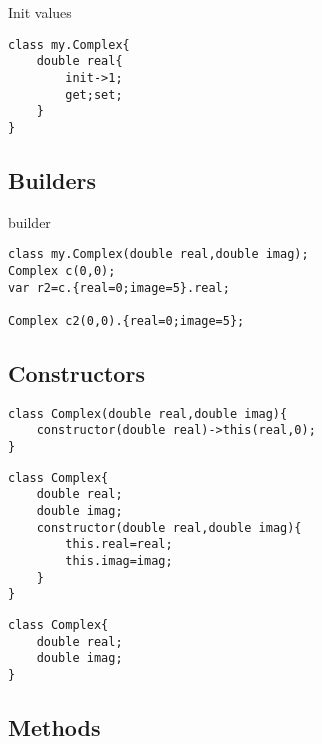 \documentclass{tufte-book}
\begin{document}
            Init values

\lstset{mathescape=true}
            \begin{lstlisting}
class my.Complex{
    double real{
        init->1;
        get;set;
    }
}
            \end{lstlisting}
\lstset{mathescape=false}


            \subsection{Builders}
builder
\lstset{mathescape=true}
            \begin{lstlisting}
class my.Complex(double real,double imag);
Complex c(0,0);
var r2=c.{real=0;image=5}.real;

Complex c2(0,0).{real=0;image=5};

            \end{lstlisting}
\lstset{mathescape=false}



            \subsection{Constructors}

            \begin{lstlisting}
class Complex(double real,double imag){
    constructor(double real)->this(real,0);
}
            \end{lstlisting}

            \begin{lstlisting}
class Complex{
    double real;
    double imag;
    constructor(double real,double imag){
        this.real=real;
        this.imag=imag;
    }
}    
            \end{lstlisting}

            \begin{lstlisting}
class Complex{
    double real;
    double imag;
}
            \end{lstlisting}





            \subsection{Methods}
\end{document}
